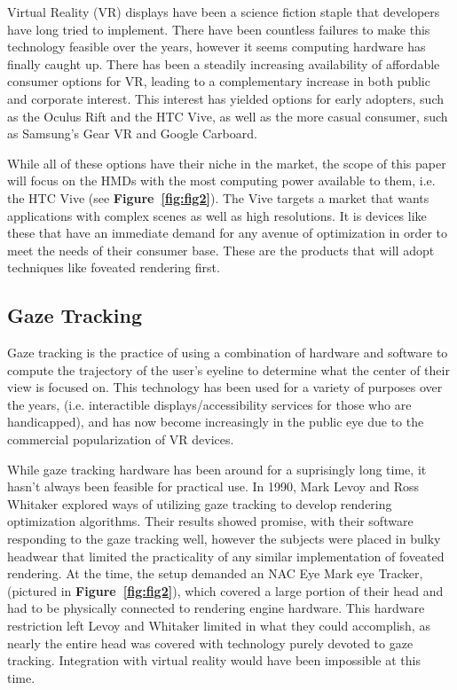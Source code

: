 \documentclass{sig-alternate}
\begin{document}
Virtual Reality (VR) displays have been a science fiction staple that developers have long tried to implement. There have been countless failures to make this technology feasible over the years, however it seems computing hardware has finally caught up. There has been a steadily increasing availability of affordable consumer options for VR, leading to a complementary increase in both public and corporate interest. This interest has yielded options for early adopters, such as the Oculus Rift and the HTC Vive, as well as the more casual consumer, such as Samsung's Gear VR and Google Carboard.


While all of these options have their niche in the market, the scope of this paper will focus on the HMDs with the most computing power available to them, i.e. the HTC Vive (see \textbf{Figure~\ref{fig:fig2}}). The Vive targets a market that wants applications with complex scenes as well as high resolutions. It is devices like these that have an immediate demand for any avenue of optimization in order to meet the needs of their consumer base. These are the products that will adopt techniques like foveated rendering first.

\subsection{Gaze Tracking}
\label{sec:gazeTracking}

Gaze tracking is the practice of using a combination of hardware and software to compute the trajectory of the user's eyeline to determine what the center of their view is focused on. This technology has been used for a variety of purposes over the years, (i.e. interactible displays/accessibility services for those who are handicapped), and has now become increasingly in the public eye due to the commercial popularization of VR devices.

While gaze tracking hardware has been around for a suprisingly long time, it hasn't always been feasible for practical use. In 1990, Mark Levoy and Ross Whitaker explored ways of utilizing gaze tracking to develop rendering optimization algorithms. Their results showed promise, with their software responding to the gaze tracking well, however the subjects were placed in bulky headwear that limited the practicality of any similar implementation of foveated rendering. At the time, the setup demanded an NAC Eye Mark eye Tracker, (pictured in \textbf{Figure~\ref{fig:fig2}}), which covered a large portion of their head and had to be physically connected to rendering engine hardware. This hardware restriction left Levoy and Whitaker limited in what they could accomplish, as nearly the entire head was covered with technology purely devoted to gaze tracking. Integration with virtual reality would have been impossible at this time.~\cite{Levoy:Gaze}
\end{document}

